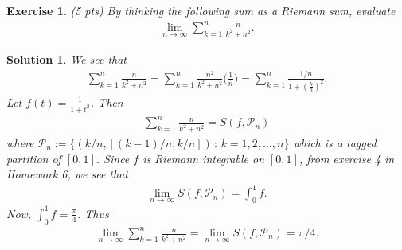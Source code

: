 \documentclass[12pt]{article}
\newcommand{\cP}{\mathcal{P}}
\newcommand{\ra}{\rightarrow}
\theoremstyle{plain}
\newtheorem{exer}{\textbf{Exercise}}}
\theoremstyle{plain}
\newtheorem*{sol}{\textbf{Solution}}}
\theoremstyle{plain}
\theoremstyle{plain}
\begin{document}
\begin{exer}
(5 pts)
By thinking the following sum as a Riemann sum, evaluate
	\begin{align*}
	\lim_{n \ra \infty} \sum_{k = 1}^n \frac{n}{k^2 + n^2} .
	\end{align*}
\end{exer}
\begin{sol}
We see that
	\begin{align*}
	\sum_{k= 1}^n \frac{n}{k^2 + n^2} = \sum_{k= 1}^n \frac{n^2}{k^2 + n^2} \Big( \frac{1}{n} \Big) = \sum_{k = 1}^n \frac{1/n}{1 + ( \frac{k}{n})^2} .
	\end{align*}
Let $f(t) = \frac{1}{1 + t^2}$. Then
	\begin{align*}
	\sum_{k = 1}^n \frac{n}{k^2 + n^2} = S (f, \cP_n )
	\end{align*}
where $\cP_n := \{ (k/n , [ (k-1)/n , k/n]) \, : \, k = 1, 2, \ldots , n \}$ which is a tagged partition of $[0, 1]$. Since $f$ is Riemann integrable on $[0, 1]$, from exercise 4 in Homework 6, we see that
	\begin{align*}
	\lim_{n \ra \infty} S (f, \cP_n ) = \int_0^1 f .
	\end{align*}
Now, $\int_0^1 f = \frac{\pi}{4}$. Thus
	\begin{align*}
	\lim_{n \ra \infty} \sum_{k = 1}^n \frac{n}{k^2 + n^2} = \lim_{n \ra \infty} S (f , \cP_n ) = \pi/4 .
	\end{align*}
\end{sol}
\end{document}
